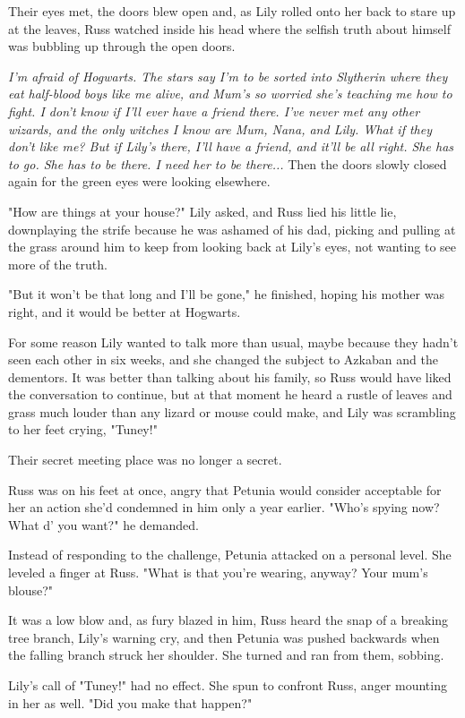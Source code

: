 \documentclass[a4paper,11pt]{article}
\begin{document}
Their eyes met, the doors blew open and, as Lily rolled onto her back to stare up at the leaves, Russ watched inside his head where the selfish truth about himself was bubbling up through the open doors.

\emph{I'm afraid of Hogwarts. The stars say I'm to be sorted into Slytherin where they eat half-blood boys like me alive, and Mum's so worried she's teaching me how to fight. I don't know if I'll ever have a friend there. I've never met any other wizards, and the only witches I know are Mum, Nana, and Lily. What if they don't like me? But if Lily's there, I'll have a friend, and it'll be all right. She has to go. She has to be there. I need her to be there...} Then the doors slowly closed again for the green eyes were looking elsewhere.

"How are things at your house?" Lily asked, and Russ lied his little lie, downplaying the strife because he was ashamed of his dad, picking and pulling at the grass around him to keep from looking back at Lily's eyes, not wanting to see more of the truth.

"But it won't be that long and I'll be gone," he finished, hoping his mother was right, and it would be better at Hogwarts.

For some reason Lily wanted to talk more than usual, maybe because they hadn't seen each other in six weeks, and she changed the subject to Azkaban and the dementors. It was better than talking about his family, so Russ would have liked the conversation to continue, but at that moment he heard a rustle of leaves and grass much louder than any lizard or mouse could make, and Lily was scrambling to her feet crying, "Tuney!"

Their secret meeting place was no longer a secret.

Russ was on his feet at once, angry that Petunia would consider acceptable for her an action she'd condemned in him only a year earlier. "Who's spying now? What d' you want?" he demanded.

Instead of responding to the challenge, Petunia attacked on a personal level. She leveled a finger at Russ. "What is that you're wearing, anyway? Your mum's blouse?"

It was a low blow and, as fury blazed in him, Russ heard the snap of a breaking tree branch, Lily's warning cry, and then Petunia was pushed backwards when the falling branch struck her shoulder. She turned and ran from them, sobbing.

Lily's call of "Tuney!" had no effect. She spun to confront Russ, anger mounting in her as well. "Did you make that happen?"
\end{document}
